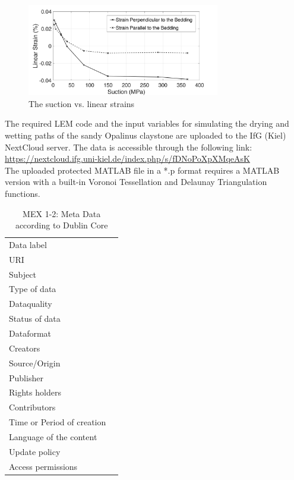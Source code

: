 \begin{figure}[!ht]
\centering
\includegraphics[width=0.75\textwidth]{figures/Amir_ME6_Strain_Data.png}
\caption{The suction vs. linear strains}
\label{fig:Amir_ME6_Strain_Data}
\end{figure}

The required LEM code and the input variables for simulating the drying and wetting paths of the sandy Opalinus claystone are uploaded to the IfG (Kiel) NextCloud server. The data is accessible through the following link:\\
\hyperlink{https://nextcloud.ifg.uni-kiel.de/index.php/s/fDNoPoXpXMqeAsK}{https://nextcloud.ifg.uni-kiel.de/index.php/s/fDNoPoXpXMqeAsK}\\

The uploaded protected MATLAB file in a *.p format requires a MATLAB version with a built-in Voronoi Tessellation and Delaunay Triangulation functions.

\begin{table}[!ht]
\caption{MEX 1-2: Meta Data according to Dublin Core}
\label{tab:dms-mex1-2}
\small
\begin{tabular}{R{3cm}|L{7cm}}
\hline
%
Data label &  \\
URI &  \\
Subject  &  \\
Type of data  &  \\
Dataquality  &  \\
Status of data  &  \\
Dataformat  & \\
Creators  &  \\
Source/Origin &  \\
Publisher  &  \\
Rights holders &  \\
Contributors &  \\
Time or Period of creation &  \\
Language of the content &  \\
Update policy &  \\
Access permissions &  \\
%
\hline
\end{tabular}
\end{table}

